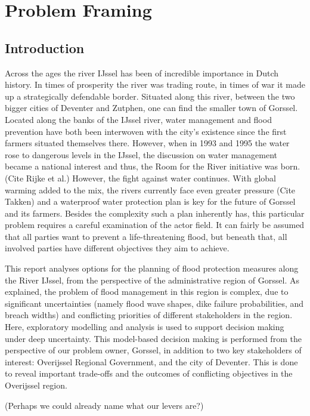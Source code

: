 \section{Problem Framing}
\label{s:prob_frame}
\subsection{Introduction}
Across the ages the river IJssel has been of incredible importance in Dutch history. In times of prosperity the river was trading route, in times of war it made up a strategically defendable border. Situated along this river, between the two bigger cities of Deventer and Zutphen, one can find the smaller town of Gorssel. Located along the banks of the IJssel river, water management and flood prevention have both been interwoven with the city's existence since the first farmers situated themselves there. However, when in 1993 and 1995 the water rose to dangerous levels in the IJssel, the discussion on water management became a national interest and thus, the Room for the River initiative was born. (Cite Rijke et al.) However, the fight against water continues. With global warming added to the mix, the rivers currently face even greater pressure (Cite Takken) and a waterproof water protection plan is key for the future of Gorssel and its farmers. Besides the complexity such a plan inherently has, this particular problem requires a careful examination of the actor field. It can fairly be assumed that all parties want to prevent a life-threatening flood, but beneath that, all involved parties have different objectives they aim to achieve. 

This report analyses options for the planning of flood protection measures along the River IJssel, from the perspective of the administrative region of Gorssel. As explained, the problem of flood management in this region is complex, due to significant uncertainties (namely flood wave shapes, dike failure probabilities, and breach widths) and conflicting priorities of different stakeholders in the region. Here, exploratory modelling and analysis is used to support decision making under deep uncertainty. This model-based decision making is performed from the perspective of our problem owner, Gorssel, in addition to two key stakeholders of interest: Overijssel Regional Government, and the city of Deventer. This is done to reveal important trade-offs and the outcomes of conflicting objectives in the Overijssel region.

(Perhaps we could already name what our levers are?) 


